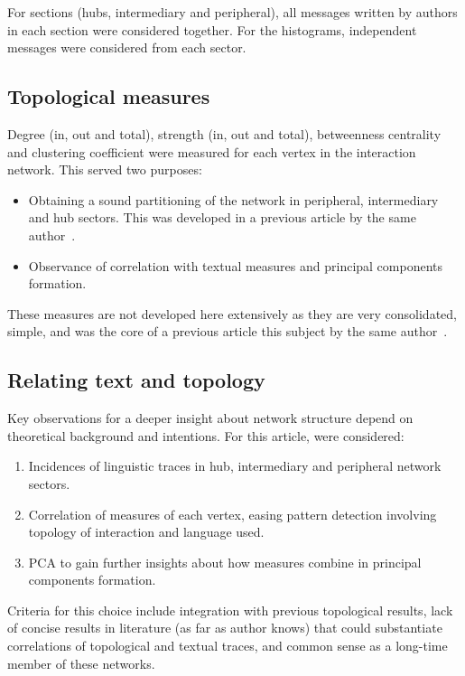 \documentclass[%
 aip,
 jmp,%
 amsmath,amssymb,
 reprint,%
]{revtex4-1}
\begin{document}
For sections (hubs, intermediary and peripheral),
all messages written by authors in each section were considered together. For the histograms, independent messages were considered from each sector. 

\subsection{Topological measures}\label{subsec:top}
Degree (in, out and total), strength (in, out and total), betweenness centrality and clustering coefficient were measured for each vertex in the interaction network. This served two purposes:
\begin{itemize}
    \item Obtaining a sound partitioning of the network in peripheral, intermediary and hub sectors. This was developed in a previous article by the same author~\cite{evoSN}.
    \item Observance of correlation with textual measures and principal components formation.
\end{itemize}

These measures are not developed here extensively as they are very consolidated, simple, and was the core of a previous article this subject by the same author~\cite{evoSN}.


\subsection{Relating text and topology}
Key observations for a deeper insight about network structure depend on
theoretical background and intentions. For this article, were considered:
\begin{enumerate}
    \item Incidences of linguistic traces in hub, intermediary and peripheral network sectors.
    \item Correlation of measures of each vertex, easing pattern detection involving topology of interaction and language used.
    \item PCA to gain further insights about how measures combine in principal components formation.
\end{enumerate}

Criteria for this choice include integration with previous topological results, lack of concise results in literature (as far as author knows) that
could substantiate correlations of topological and textual traces, and common sense as a long-time member of these networks.
\end{document}
